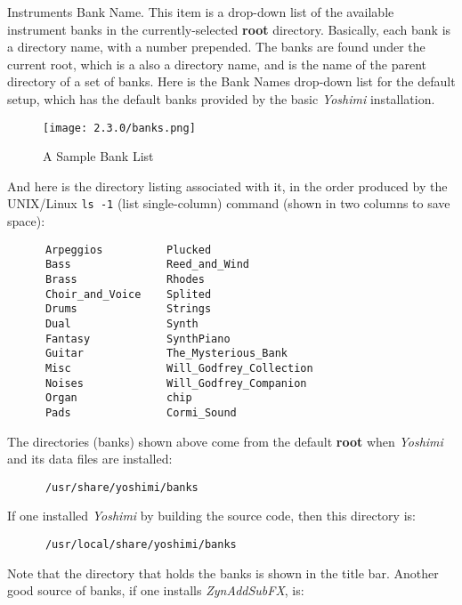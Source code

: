    \setcounter{ItemCounter}{0}      %

   Instruments Bank Name.
   This item is a drop-down list of the available instrument banks in the
   currently-selected \textbf{root} directory.
   Basically, each bank is a directory name, with a number prepended.
   The banks are found under the current root, which is a also a directory
   name, and is the name of the parent directory of a set of banks.
   Here is the Bank Names drop-down list for the default setup, which has the
   default banks provided by the basic \textsl{Yoshimi} installation.

\begin{figure}[H]
   \centering
   \texttt{[image: 2.3.0/banks.png]}
   \caption[A Sample Bank List]{A Sample Bank List}
   \label{fig:bank_list}
\end{figure}

   And here is the directory listing associated with it, in the order
   produced by the UNIX/Linux \texttt{ls -1}
   (list single-column) command (shown in
   two columns to save space):

   \begin{verbatim}
      Arpeggios          Plucked
      Bass               Reed_and_Wind
      Brass              Rhodes
      Choir_and_Voice    Splited
      Drums              Strings
      Dual               Synth
      Fantasy            SynthPiano
      Guitar             The_Mysterious_Bank
      Misc               Will_Godfrey_Collection
      Noises             Will_Godfrey_Companion
      Organ              chip
      Pads               Cormi_Sound
   \end{verbatim}

   The directories (banks) shown above come from the default \textbf{root}
   when \textsl{Yoshimi} and its data files are installed:

   \begin{verbatim}
      /usr/share/yoshimi/banks
   \end{verbatim}

   If one installed \textsl{Yoshimi} by building the source code, then
   this directory is:

   \begin{verbatim}
      /usr/local/share/yoshimi/banks
   \end{verbatim}

   Note that the directory that holds the banks is shown in the title bar.
   Another good source of banks, if one installs \textsl{ZynAddSubFX}, is:

